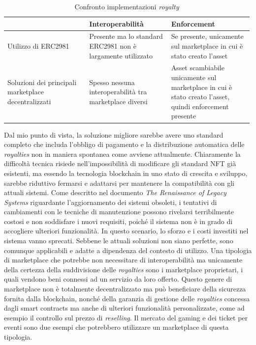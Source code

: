 \begin{table}[H]
    \centering
    \renewcommand{\arraystretch}{1.5}
    \begin{adjustbox}{max width=1\textwidth}
        \begin{tabular}{| p{0.33\linewidth} | p{0.33\linewidth} | p{0.33\linewidth} |}
            \hline
            \rowcolor{mint-cream}
                                             & Interoperabilità                                                       & Enforcement                                      \\
            \hline
            Utilizzo di ERC2981             & Presente ma lo standard ERC2981 non è largamente utilizzato            & Se presente, unicamente sul marketplace in cui è stato creato l'asset \\
            \hline
            Soluzioni dei principali marketplace decentralizzati  & Spesso nessuna interoperabilità tra marketplace diversi & Asset scambiabile unicamente sul marketplace in cui è stato creato l'asset, quindi enforcement presente \\
            \hline
        \end{tabular}
    \end{adjustbox}
    \caption{Confronto implementazioni \textit{royalty}}
    \label{table:implementazioni-royalty}
\end{table}

Dal mio punto di vista, la soluzione migliore sarebbe avere uno standard completo che includa l'obbligo di pagamento e la distribuzione automatica delle \textit{royalties} non in maniera spontanea come avviene attualmente. Chiaramente la difficoltà tecnica risiede nell'impossibilità di modificare gli standard NFT già esistenti, ma essendo la tecnologia blockchain in uno stato di crescita e sviluppo, sarebbe riduttivo fermarsi e adattarsi per mantenere la compatibilità con gli attuali sistemi. Come descritto nel documento \textit{The Renaissance of Legacy Systems} \cite{warren2012renaissance} riguardante l'aggiornamento dei sistemi obsoleti, i tentativi di cambiamenti con le tecniche di manutenzione possono rivelarsi terribilmente costosi e non soddisfare i nuovi requisiti, poiché il sistema non è in grado di accogliere ulteriori funzionalità. In questo scenario, lo sforzo e i costi investiti nel sistema vanno sprecati. Sebbene le attuali soluzioni non siano perfette, sono comunque applicabili e adatte a dipendenza del contesto di utilizzo. Una tipologia di marketplace che potrebbe non necessitare di interoperabilità ma unicamente della certezza della suddivisione delle \textit{royalties} sono i marketplace proprietari, i quali vendono beni connessi ad un servizio da loro offerto. Questo genere di marketplace non è totalmente decentralizzato ma può beneficiare della sicurezza fornita dalla blockchain, nonché della garanzia di gestione delle \textit{royalties} concessa dagli smart contracts ma anche di ulteriori funzionalità personalizzate, come ad esempio il controllo sul prezzo di \textit{reselling}. Il mercato del gaming e dei ticket per eventi sono due esempi che potrebbero utilizzare un marketplace di questa tipologia. 


